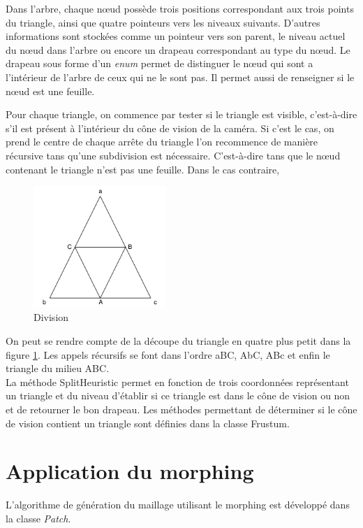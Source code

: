 	Dans l'arbre, chaque n\oe{}ud possède trois positions correspondant aux trois points du triangle,
	ainsi que quatre pointeurs vers les niveaux suivants.
	D'autres informations sont stockées comme un pointeur vers son parent, le niveau actuel du
	n\oe{}ud dans l'arbre ou encore un drapeau correspondant au type du n\oe{}ud.
	Le drapeau sous forme d'un \emph{enum} permet de distinguer le n\oe{}ud qui sont a l'intérieur de l'arbre de ceux
	qui ne le sont pas. Il permet aussi de renseigner si le n\oe{}ud est une feuille.
		
	Pour chaque triangle, on commence par tester si le triangle est visible, c'est-à-dire s'il est
	présent à l'intérieur du cône de vision de la caméra. Si c'est le cas, on prend le centre de chaque
	arrête du triangle l'on recommence de manière récursive tans qu'une subdivision est nécessaire.
	C'est-à-dire tans que le n\oe{}ud contenant le triangle n'est pas une feuille. Dans le cas contraire,
	
	
    \begin{figure}[!ht]
        \centerline{\includegraphics[width=5cm]{img/TriangleSplit.png}}
        \caption{Division}
        \label{fig:TriangleSplit}
    \end{figure}
	
	On peut se rendre compte de la découpe du triangle en quatre plus petit dans la figure 
	\ref{fig:TriangleSplit}.
	Les appels récursifs se font dans l'ordre aBC, AbC, ABc et enfin le triangle du milieu ABC.\\
	
	La méthode SplitHeuristic permet en fonction de trois coordonnées représentant un triangle 
	et du niveau d'établir si ce triangle est dans le cône de vision ou non et de retourner le bon drapeau.
	Les méthodes permettant de déterminer si le cône de vision contient un triangle sont définies dans
	la classe Frustum.
	
  \section{Application du morphing}
  L'algorithme de génération du maillage utilisant le morphing est développé dans la classe \textit{Patch}.\\ 
  
